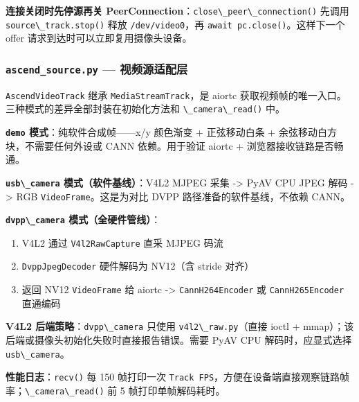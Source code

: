 \textbf{连接关闭时先停源再关
PeerConnection}：\passthrough{\lstinline!close\_peer\_connection()!}
先调用 \passthrough{\lstinline!source\_track.stop()!} 释放
\passthrough{\lstinline!/dev/video0!}，再
\passthrough{\lstinline!await pc.close()!}。这样下一个 offer
请求到达时可以立即复用摄像头设备。

\subsubsection{\texorpdfstring{\texttt{ascend\_source.py} ---
视频源适配层}{ascend\_source.py --- 视频源适配层}}\label{src-book-chapter6-h150}

\passthrough{\lstinline!AscendVideoTrack!} 继承
\passthrough{\lstinline!MediaStreamTrack!}，是 aiortc
获取视频帧的唯一入口。三种模式的差异全部封装在初始化方法和
\passthrough{\lstinline!\_camera\_read()!} 中。

\textbf{\passthrough{\lstinline!demo!} 模式}：纯软件合成帧------x/y
颜色渐变 + 正弦移动白条 + 余弦移动白方块，不需要任何外设或 CANN
依赖。用于验证 aiortc + 浏览器接收链路是否畅通。

\textbf{\passthrough{\lstinline!usb\_camera!} 模式（软件基线）}：V4L2
MJPEG 采集 -\textgreater{} PyAV CPU JPEG 解码 -\textgreater{} RGB
\passthrough{\lstinline!VideoFrame!}。这是为对比 DVPP
路径准备的软件基线，不依赖 CANN。

\textbf{\passthrough{\lstinline!dvpp\_camera!} 模式（全硬件管线）}：

\begin{enumerate}
\def\labelenumi{\arabic{enumi}.}
\tightlist
\item
  V4L2 通过 \passthrough{\lstinline!V4l2RawCapture!} 直采 MJPEG 码流
\item
  \passthrough{\lstinline!DvppJpegDecoder!} 硬件解码为 NV12（含 stride
  对齐）
\item
  返回 NV12 \passthrough{\lstinline!VideoFrame!} 给 aiortc
  -\textgreater{} \passthrough{\lstinline!CannH264Encoder!} 或
  \passthrough{\lstinline!CannH265Encoder!} 直通编码
\end{enumerate}

\textbf{V4L2 后端策略}：\passthrough{\lstinline!dvpp\_camera!} 只使用
\passthrough{\lstinline!v4l2\_raw.py!}（直接 ioctl +
mmap）；该后端或摄像头初始化失败时直接报告错误。需要 PyAV CPU
解码时，应显式选择 \passthrough{\lstinline!usb\_camera!}。

\textbf{性能日志}：\passthrough{\lstinline!recv()!} 每 150 帧打印一次
\passthrough{\lstinline!Track FPS!}，方便在设备端直接观察链路帧率；\passthrough{\lstinline!\_camera\_read()!}
前 5 帧打印单帧解码耗时。

